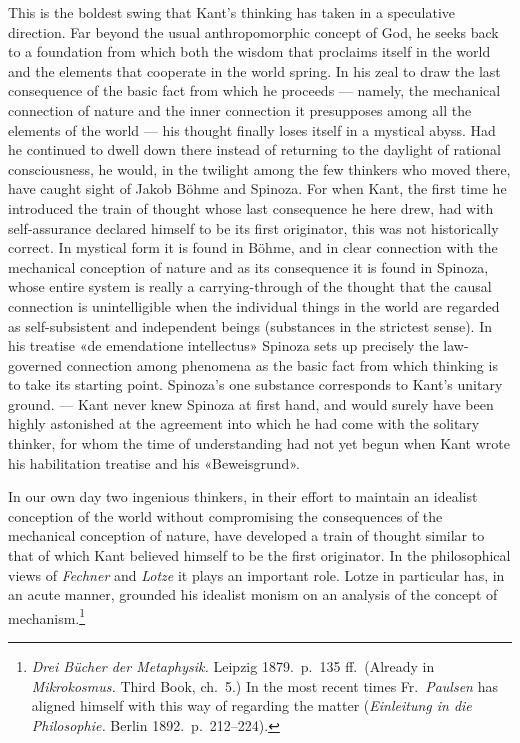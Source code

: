\documentclass[12pt,a4paper]{article}
\begin{document}
This is the boldest swing that Kant's thinking has taken in a speculative
direction. Far beyond the usual anthropomorphic concept of God, he seeks
back to a foundation from which both the wisdom that proclaims itself in
the world and the elements that cooperate in the world spring. In his zeal
to draw the last consequence of the basic fact from which he proceeds ---
namely, the mechanical connection of nature and the inner connection it
presupposes among all the elements of the world --- his thought finally
loses itself in a mystical abyss. Had he continued to dwell down there
instead of returning to the daylight of rational consciousness, he would,
in the twilight among the few thinkers who moved there, have caught sight
of Jakob Böhme and Spinoza. For when Kant, the first time he introduced
the train of thought whose last consequence he here drew, had with
self-assurance declared himself to be its first originator, this was not
historically correct. In mystical form it is found in Böhme, and in clear
connection with the mechanical conception of nature and as its consequence
it is found in Spinoza, whose entire system is really a carrying-through
of the thought that the causal connection is unintelligible when the
individual things in the world are regarded as self-subsistent and
independent beings (substances in the strictest sense). In his treatise
«de emendatione intellectus» Spinoza sets up precisely the law-governed
connection among phenomena as the basic fact from which thinking is to
take its starting point. Spinoza's one substance corresponds to Kant's
unitary ground. --- Kant never knew Spinoza at first hand, and would
surely have been highly astonished at the agreement into which he had come
with the solitary thinker, for whom the time of understanding had not yet
begun when Kant wrote his habilitation treatise and his «Beweisgrund».

In our own day two ingenious thinkers, in their effort to maintain an
idealist conception of the world without compromising the consequences of
the mechanical conception of nature, have developed a train of thought
similar to that of which Kant believed himself to be the first originator.
In the philosophical views of \emph{Fechner} and \emph{Lotze} it plays an important
role. Lotze in particular has, in an acute manner, grounded his idealist
monism on an analysis of the concept of
mechanism.\footnote{\textit{Drei Bücher der Metaphysik.} Leipzig 1879.\
p.\ 135 ff.\ (Already in \textit{Mikrokosmus.} Third Book, ch.\ 5.) In the
most recent times Fr.\ \emph{Paulsen} has aligned himself with this way of
regarding the matter (\textit{Einleitung in die Philosophie.} Berlin
1892.\ p.\ 212--224).}
\end{document}

